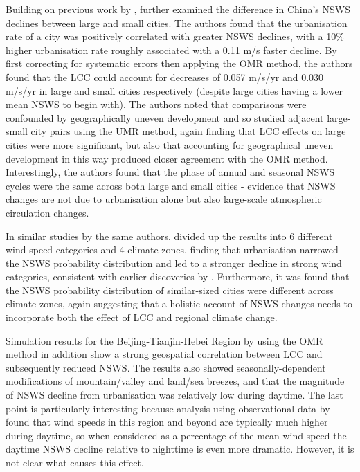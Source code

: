 Building on previous work by \citet{guo2011}, \citet{zha2017} further examined the difference in China’s \ac{NSWS} declines between large and small cities. The authors found that the urbanisation rate of a city was positively correlated with greater \ac{NSWS} declines, with a 10\% higher urbanisation rate roughly associated with a 0.11 m/s faster decline. By first correcting for systematic errors then applying the \ac{OMR} method, the authors found that the \ac{LCC} could account for decreases of 0.057 m/s/yr and 0.030 m/s/yr in large and small cities respectively (despite large cities having a lower mean \ac{NSWS} to begin with). The authors noted that comparisons were confounded by geographically uneven development and so studied adjacent large-small city pairs using the \ac{UMR} method, again finding that \ac{LCC} effects on large cities were more significant, but also that accounting for geographical uneven development in this way produced closer agreement with the \ac{OMR} method. Interestingly, the authors found that the phase of annual and seasonal \ac{NSWS} cycles were the same across both large and small cities - evidence that \ac{NSWS} changes are not due to urbanisation alone but also large-scale atmospheric circulation changes.

In similar studies by the same authors, \citet{zha2016, zha2017_zones} divided up the results into 6 different wind speed categories and 4 climate zones, finding that urbanisation narrowed the \ac{NSWS} probability distribution and led to a stronger decline in strong wind categories, consistent with earlier discoveries by \citet{guo2011}. Furthermore, it was found that the \ac{NSWS} probability distribution of similar-sized cities were different across climate zones, again suggesting that a holistic account of \ac{NSWS} changes needs to incorporate both the effect of \ac{LCC} and regional climate change.

Simulation results for the Beijing-Tianjin-Hebei Region by \citet{wang2020} using the \ac{OMR} method in addition show a strong geospatial correlation between \ac{LCC} and subsequently reduced \ac{NSWS}. The results also showed seasonally-dependent modifications of mountain/valley and land/sea breezes, and that the magnitude of \ac{NSWS} decline from urbanisation was relatively low during daytime. The last point is particularly interesting because analysis using observational data by \citet{yu2009} found that wind speeds in this region and beyond are typically much higher during daytime, so when considered as a percentage of the mean wind speed the daytime \ac{NSWS} decline relative to nighttime is even more dramatic. However, it is not clear what causes this effect.

